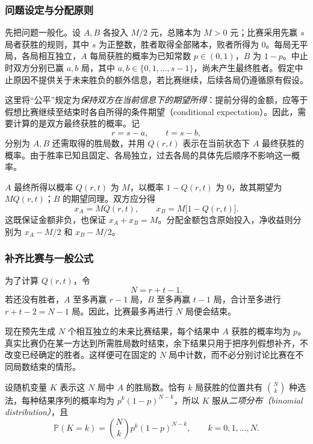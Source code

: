 \subsubsection{问题设定与分配原则}
\label{subsubsec:points-problem}

先把问题一般化。设 $A,B$ 各投入 $M/2$ 元，总赌本为 $M>0$ 元；比赛采用先赢 $s$ 局者获胜的规则，其中 $s$ 为正整数，胜者取得全部赌本，败者所得为 $0$。每局无平局，各局相互独立，$A$ 每局获胜的概率为已知常数 $p\in(0,1)$，$B$ 为 $1-p$。中止时双方分别已赢 $a,b$ 局，其中 $a,b\in\{0,1,\ldots,s-1\}$，尚未产生最终胜者。假定中止原因不提供关于未来胜负的额外信息，若比赛继续，后续各局仍遵循原有假设。

这里将“公平”规定为\emph{保持双方在当前信息下的期望所得}：提前分得的金额，应等于假想比赛继续至结束时各自所得的条件期望（conditional expectation）。因此，需要计算的是双方最终获胜的概率。记
\begin{equation}
  r=s-a,\qquad t=s-b,
  \label{eq:points-remaining}
\end{equation}
分别为 $A,B$ 还需取得的胜局数，并用 $Q(r,t)$ 表示在当前状态下 $A$ 最终获胜的概率。由于胜率已知且固定、各局独立，过去各局的具体先后顺序不影响这一概率。

$A$ 最终所得以概率 $Q(r,t)$ 为 $M$，以概率 $1-Q(r,t)$ 为 $0$，故其期望为 $M Q(r,t)$；$B$ 的期望同理。双方应分得
\begin{equation}
  x_A=M Q(r,t),\qquad x_B=M\bigl[1-Q(r,t)\bigr].
  \label{eq:points-allocation}
\end{equation}
这既保证金额非负，也保证 $x_A+x_B=M$。分配金额包含原始投入，净收益则分别为 $x_A-M/2$ 和 $x_B-M/2$。

\subsubsection{补齐比赛与一般公式}
\label{subsubsec:points-binomial}

为了计算 $Q(r,t)$，令
\begin{equation}
  N=r+t-1.
  \label{eq:points-horizon}
\end{equation}
若还没有胜者，$A$ 至多再赢 $r-1$ 局，$B$ 至多再赢 $t-1$ 局，合计至多进行 $r+t-2=N-1$ 局。因此，比赛最多再进行 $N$ 局便会结束。

现在预先生成 $N$ 个相互独立的未来比赛结果，每个结果中 $A$ 获胜的概率均为 $p$。真实比赛仍在某一方达到所需胜局数时结束，余下结果只用于把序列假想补齐，不改变已经确定的胜者。这样便可在固定的 $N$ 局中计数，而不必分别讨论比赛在不同局数结束的情形。

设随机变量 $K$ 表示这 $N$ 局中 $A$ 的胜局数。恰有 $k$ 局获胜的位置共有 $\binom Nk$ 种选法，每种结果序列的概率均为 $p^k(1-p)^{N-k}$，所以 $K$ 服从\emph{二项分布（binomial distribution）}，且
\begin{equation}
  \mathbb P(K=k)=\binom Nk p^k(1-p)^{N-k},
  \qquad k=0,1,\ldots,N.
  \label{eq:points-binomial-mass}
\end{equation}

